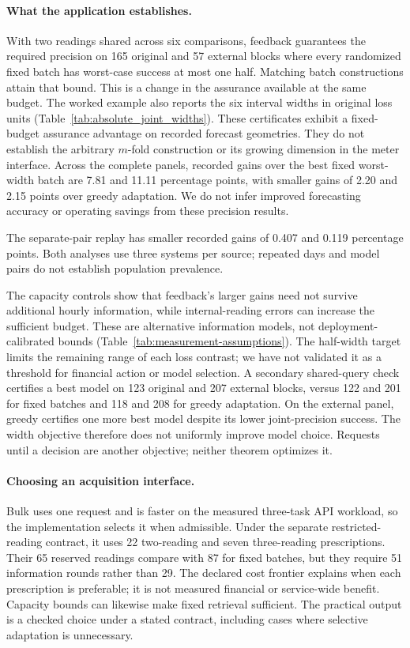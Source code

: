\documentclass[12pt]{article}
\begin{document}
\paragraph{What the application establishes.}
With two readings shared across six comparisons, feedback guarantees the
required precision on 165 original and 57 external blocks where every
randomized fixed batch has worst-case success at most one half. Matching
batch constructions attain that bound. This is a change in the assurance
available at the same budget. The worked example also reports the six
interval widths in original loss units (Table~\ref{tab:absolute_joint_widths}).
These certificates exhibit a fixed-budget assurance advantage on recorded
forecast geometries. They do not establish the arbitrary $m$-fold
construction or its growing dimension in the meter interface. Across the
complete panels, recorded gains over the best fixed worst-width
batch are 7.81 and 11.11 percentage points, with smaller gains of 2.20 and
2.15 points over greedy adaptation. We do not infer improved forecasting
accuracy or operating savings from these precision results.

The separate-pair replay has smaller recorded gains of 0.407 and
0.119 percentage points. Both analyses use three systems per source;
repeated days and model pairs do not establish population prevalence.

The capacity controls show that feedback's larger gains need not survive
additional hourly information, while internal-reading errors can increase
the sufficient budget. These are alternative information models, not
deployment-calibrated bounds (Table~\ref{tab:measurement-assumptions}).
The half-width target limits the remaining range of each loss contrast;
we have not validated it as a threshold for financial action or model selection.
A secondary shared-query check
certifies a best model on 123 original and 207 external blocks, versus
122 and 201 for fixed batches and 118 and 208 for greedy adaptation.
On the external panel, greedy certifies one more best model despite its
lower joint-precision success. The width objective therefore does not
uniformly improve model choice.
Requests until a decision are another objective; neither theorem optimizes it.

\paragraph{Choosing an acquisition interface.}
Bulk uses one request and is faster on the measured three-task API workload,
so the implementation selects it when admissible. Under the separate
restricted-reading contract, it uses 22 two-reading and seven three-reading
prescriptions. Their 65 reserved readings compare with 87 for fixed batches,
but they require 51 information rounds rather than 29. The declared cost
frontier explains when each prescription is preferable; it is not measured
financial or service-wide benefit. Capacity bounds can likewise make fixed
retrieval sufficient. The practical output is a checked choice under a stated
contract, including cases where selective adaptation is unnecessary.
\end{document}
